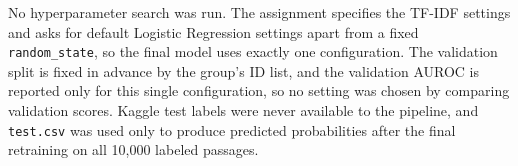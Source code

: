 No hyperparameter search was run. The assignment specifies the TF-IDF settings and asks for default Logistic Regression settings apart from a fixed \texttt{random\_state}, so the final model uses exactly one configuration. The validation split is fixed in advance by the group's ID list, and the validation AUROC is reported only for this single configuration, so no setting was chosen by comparing validation scores. Kaggle test labels were never available to the pipeline, and \texttt{test.csv} was used only to produce predicted probabilities after the final retraining on all 10,000 labeled passages.
